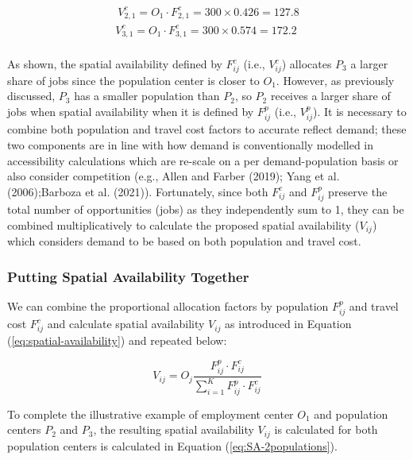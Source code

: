 \documentclass[]{elsarticle} %
\begin{document}
\begin{equation}
\label{eq:tcost-allocation-factor-SA-2populations}
\begin{array}{l}\
V^c_{2,1} = O_1 \cdot F^c_{2,1} = 300 \times 0.426 = 127.8\\
V^c_{3,1} = O_1 \cdot F^c_{3,1} = 300 \times  0.574 = 172.2\\
\end{array}
\end{equation}

As shown, the spatial availability defined by \(F^c_{ij}\) (i.e.,
\(V^c_{ij}\)) allocates \(P_3\) a larger share of jobs since the
population center is closer to \(O_1\). However, as previously
discussed, \(P_3\) has a smaller population than \(P_2\), so \(P_2\)
receives a larger share of jobs when spatial availability when it is
defined by \(F^p_{ij}\) (i.e., \(V^p_{ij}\)). It is necessary to combine
both population and travel cost factors to accurate reflect demand;
these two components are in line with how demand is conventionally
modelled in accessibility calculations which are re-scale on a per
demand-population basis or also consider competition (e.g., Allen and
Farber (2019); Yang et al. (2006);Barboza et al. (2021)). Fortunately,
since both \(F^c_{ij}\) and \(F^p_{ij}\) preserve the total number of
opportunities (jobs) as they independently sum to 1, they can be
combined multiplicatively to calculate the proposed spatial availability
(\(V_{ij}\)) which considers demand to be based on both population and
travel cost.

\hypertarget{putting-spatial-availability-together}{%
\subsubsection{Putting Spatial Availability
Together}\label{putting-spatial-availability-together}}

We can combine the proportional allocation factors by population
\(F^p_{ij}\) and travel cost \(F^c_{ij}\) and calculate spatial
availability \(V_{ij}\) as introduced in Equation
(\ref{eq:spatial-availability}) and repeated below:

\[
V_{ij} = O_j\frac{F^p_{ij} \cdot F^c_{ij}}{\sum_{i=1}^K F^p_{ij} \cdot F^c_{ij}}
\]

To complete the illustrative example of employment center \(O_1\) and
population centers \(P_2\) and \(P_3\), the resulting spatial
availability \(V_{ij}\) is calculated for both population centers is
calculated in Equation (\ref{eq:SA-2populations}).
\end{document}

